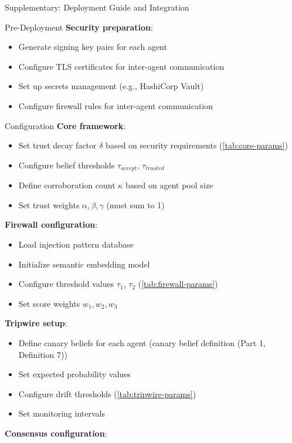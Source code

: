 \documentclass[
  ignorenonframetext,
]{beamer}
\begin{document}
\begin{frame}[fragile]{Supplementary: Deployment Guide and Integration}
\begin{block}{Pre-Deployment}
\textbf{Security preparation}:

\begin{itemize}
\item Generate signing key pairs for each agent
\item Configure TLS certificates for inter-agent communication
\item Set up secrets management (e.g., HashiCorp Vault)
\item Configure firewall rules for inter-agent communication
\end{itemize}

\begin{block}{Configuration}
\protect{}\label{sec:config-checklist}
\textbf{Core framework}:

\begin{itemize}
\item Set trust decay factor $\delta$ based on security requirements (\cref{tab:core-params})
\item Configure belief thresholds $\tau_{accept}$, $\tau_{trusted}$
\item Define corroboration count $\kappa$ based on agent pool size
\item Set trust weights $\alpha, \beta, \gamma$ (must sum to 1)
\end{itemize}

\textbf{Firewall configuration}:

\begin{itemize}
\item Load injection pattern database
\item Initialize semantic embedding model
\item Configure threshold values $\tau_1$, $\tau_2$ (\cref{tab:firewall-params})
\item Set score weights $w_1, w_2, w_3$
\end{itemize}

\textbf{Tripwire setup}:

\begin{itemize}
\item Define canary beliefs for each agent (canary belief definition (Part 1, Definition 7))
\item Set expected probability values
\item Configure drift thresholds (\cref{tab:tripwire-params})
\item Set monitoring intervals
\end{itemize}

\textbf{Consensus configuration}:


\end{block}
\end{block}
\end{frame}
\end{document}
